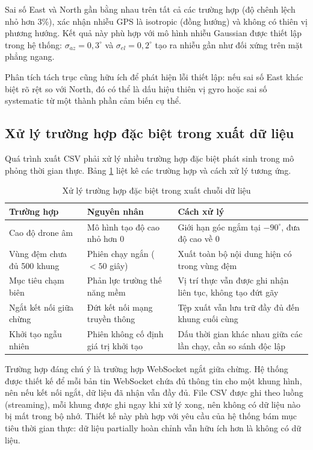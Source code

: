 Sai số East và North gần bằng nhau trên tất cả các trường hợp (độ chênh lệch nhỏ hơn 3\%), xác nhận nhiễu GPS là isotropic (đồng hướng) và không có thiên vị phương hướng. Kết quả này phù hợp với mô hình nhiễu Gaussian được thiết lập trong hệ thống: $\sigma_{az} = 0{,}3^{\circ}$ và $\sigma_{el} = 0{,}2^{\circ}$ tạo ra nhiễu gần như đối xứng trên mặt phẳng ngang.

Phân tích tách trục cũng hữu ích để phát hiện lỗi thiết lập: nếu sai số East khác biệt rõ rệt so với North, đó có thể là dấu hiệu thiên vị gyro hoặc sai số systematic từ một thành phần cảm biến cụ thể.

\subsection{Xử lý trường hợp đặc biệt trong xuất dữ liệu}

\hspace{0.5cm} Quá trình xuất CSV phải xử lý nhiều trường hợp đặc biệt phát sinh trong mô phỏng thời gian thực. Bảng \ref{tab:csv-edge-cases} liệt kê các trường hợp và cách xử lý tương ứng.

\begin{table}[H]
\centering
\caption{Xử lý trường hợp đặc biệt trong xuất chuỗi dữ liệu}
\label{tab:csv-edge-cases}
\begin{tabularx}{\linewidth}{lXX}
\toprule
\textbf{Trường hợp} & \textbf{Nguyên nhân} & \textbf{Cách xử lý} \\
\midrule
Cao độ drone âm & Mô hình tạo độ cao nhỏ hơn 0 & Giới hạn góc ngắm tại $-90^{\circ}$, đưa độ cao về 0 \\
Vùng đệm chưa đủ 500 khung & Phiên chạy ngắn ($< 50$ giây) & Xuất toàn bộ nội dung hiện có trong vùng đệm \\
Mục tiêu chạm biên & Phản lực trường thế năng mềm & Vị trí thực vẫn được ghi nhận liên tục, không tạo đứt gãy \\
Ngắt kết nối giữa chừng & Đứt kết nối mạng truyền thông & Tệp xuất vẫn lưu trữ đầy đủ đến khung cuối cùng \\
Khởi tạo ngẫu nhiên & Phiên không cố định giá trị khởi tạo & Dấu thời gian khác nhau giữa các lần chạy, cần so sánh độc lập \\
\bottomrule
\end{tabularx}
\end{table}

Trường hợp đáng chú ý là trường hợp WebSocket ngắt giữa chừng. Hệ thống được thiết kế để mỗi bản tin WebSocket chứa đủ thông tin cho một khung hình, nên nếu kết nối ngắt, dữ liệu đã nhận vẫn đầy đủ. File CSV được ghi theo luồng (streaming), mỗi khung được ghi ngay khi xử lý xong, nên không có dữ liệu nào bị mất trong bộ nhớ. Thiết kế này phù hợp với yêu cầu của hệ thống bám mục tiêu thời gian thực: dữ liệu partially hoàn chỉnh vẫn hữu ích hơn là không có dữ liệu.

